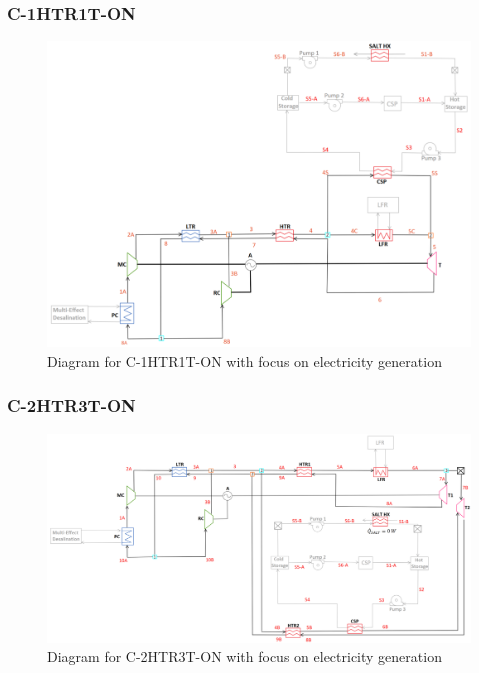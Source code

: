 \begin{paracol}{2}
\linenumbers
\switchcolumn

\subsubsection{C-1HTR1T-ON} %
\end{paracol}
\begin{figure}[H]
    \widefigure
    \includegraphics[width=\linewidth]{Definitions/c-1htr1t-on.pdf}
    \caption{Diagram for C-1HTR1T-ON with focus on electricity generation\label{c-1htr1t-on}}
\end{figure}
\begin{paracol}{2}
\linenumbers
\switchcolumn

\subsubsection{C-2HTR3T-ON} %
\end{paracol}
\begin{figure}[H]
    \widefigure
    \includegraphics[width=\linewidth]{Definitions/c-2htr3t-on.pdf}
    \caption{Diagram for C-2HTR3T-ON with focus on electricity generation\label{c-2htr3t-on}}
\end{figure}

